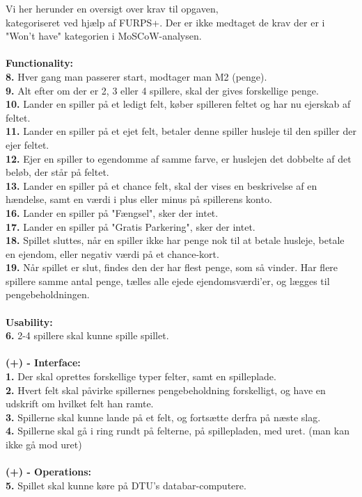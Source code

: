 \pagebreak

\noindent Vi her herunder en oversigt over krav til opgaven, \\ kategoriseret ved hjælp af FURPS+. Der er ikke medtaget de krav der er i "Won't have" kategorien i MoSCoW-analysen.
\\\\\textbf{Functionality:}\\
    \textbf{8.} Hver gang man passerer start, modtager man M2 (penge). \\
    \textbf{9.} Alt efter om der er 2, 3 eller 4 spillere, skal der gives forskellige penge. \\
    \textbf{10.} Lander en spiller på et ledigt felt, køber spilleren feltet og har nu ejerskab af feltet. \\
    \textbf{11.} Lander en spiller på et ejet felt, betaler denne spiller husleje til den spiller der ejer feltet. \\
    \textbf{12.} Ejer en spiller to egendomme af samme farve, er huslejen det dobbelte af det beløb, der står på feltet. \\
    \textbf{13.} Lander en spiller på et chance felt, skal der vises en beskrivelse af en hændelse, samt en værdi i plus eller minus på spillerens konto. \\
    \textbf{16.} Lander en spiller på "Fængsel", sker der intet. \\
    \textbf{17.} Lander en spiller på "Gratis Parkering", sker der intet. \\
    \textbf{18.} Spillet sluttes, når en spiller ikke har penge nok til at betale husleje, betale en ejendom, eller negativ værdi på et chance-kort. \\
    \textbf{19.} Når spillet er slut, findes den der har flest penge, som så vinder. Har flere spillere samme antal penge, tælles alle ejede ejendomsværdi’er, og lægges til pengebeholdningen.
\\\\\textbf{Usability:}\\
    \textbf{6.} 2-4 spillere skal kunne spille spillet.
\\\\\textbf{(+) - Interface:}\\
    \textbf{1.} Der skal oprettes forskellige typer felter, samt en spilleplade. \\
    \textbf{2.} Hvert felt skal påvirke spillernes pengebeholdning forskelligt, og have en udskrift om hvilket felt han ramte. \\
    \textbf{3.} Spillerne skal kunne lande på et felt, og fortsætte derfra på næste slag. \\
    \textbf{4.} Spillerne skal gå i ring rundt på felterne, på spillepladen, med uret. (man kan ikke gå mod uret)
\\\\\textbf{(+) - Operations:}\\
    \textbf{5.} Spillet skal kunne køre på DTU’s databar-computere. \\

